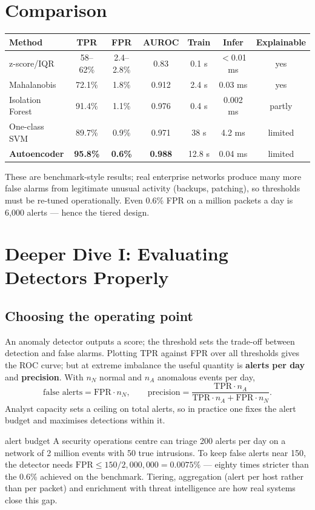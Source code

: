 \documentclass[11pt]{article}
\begin{document}
\section{Comparison}
\begin{center}\small\renewcommand{\arraystretch}{1.2}
\begin{tabular}{lcccccc}\toprule Method & TPR & FPR & AUROC & Train & Infer & Explainable\\\midrule z-score/IQR & 58--62\% & 2.4--2.8\% & 0.83 & 0.1 s & $<$0.01 ms & yes\\ Mahalanobis & 72.1\% & 1.8\% & 0.912 & 2.4 s & 0.03 ms & yes\\ Isolation Forest & 91.4\% & 1.1\% & 0.976 & 0.4 s & 0.002 ms & partly\\ One-class SVM & 89.7\% & 0.9\% & 0.971 & 38 s & 4.2 ms & limited\\ \textbf{Autoencoder} & \textbf{95.8\%} & \textbf{0.6\%} & \textbf{0.988} & 12.8 s & 0.04 ms & limited\\\bottomrule\end{tabular}\end{center}
These are benchmark-style results; real enterprise networks produce many more false alarms from legitimate unusual activity (backups, patching), so thresholds must be re-tuned operationally. Even 0.6\% FPR on a million packets a day is 6,000 alerts --- hence the tiered design.

\section{Deeper Dive I: Evaluating Detectors Properly}
\subsection{Choosing the operating point}
An anomaly detector outputs a score; the threshold sets the trade-off between detection and false alarms. Plotting TPR against FPR over all thresholds gives the ROC curve; but at extreme imbalance the useful quantity is \textbf{alerts per day} and \textbf{precision}. With $n_N$ normal and $n_A$ anomalous events per day,
\[\text{false alerts}=\text{FPR}\cdot n_N,\qquad\text{precision}=\frac{\text{TPR}\cdot n_A}{\text{TPR}\cdot n_A+\text{FPR}\cdot n_N}.\]
Analyst capacity sets a ceiling on total alerts, so in practice one fixes the alert budget and maximises detections within it.
\begin{example}{alert budget}
A security operations centre can triage 200 alerts per day on a network of 2 million events with 50 true intrusions. To keep false alerts near 150, the detector needs $\text{FPR}\le150/2{,}000{,}000=0.0075\%$ --- eighty times stricter than the 0.6\% achieved on the benchmark. Tiering, aggregation (alert per host rather than per packet) and enrichment with threat intelligence are how real systems close this gap.
\end{example}
\end{document}
